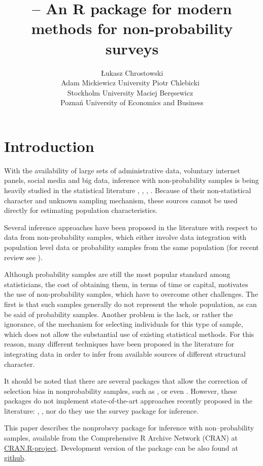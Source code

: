 \documentclass[
]{jss}
\author{
Łukasz Chrostowski\\Adam Mickiewicz University \And Piotr
Chlebicki~\orcidlink{0009-0006-4867-7434}\\Stockholm University
\AND Maciej Beręsewicz~\orcidlink{0000-0002-8281-4301}\\Poznań
University of Economics and Business
}
\title{\pkg{nonprobsvy} -- An R package for modern methods for
non-probability surveys}
\begin{document}
\hypertarget{introduction}{%
\section{Introduction}\label{introduction}}

With the availability of large sets of administrative data, voluntary
internet panels, social media and big data, inference with
non-probability samples is being heavily studied in the statistical
literature \citet{beaumont2020probability},
\citet{elliott_inference_2017}, \citet{berkesewicz2017two},
\citet{citro2014multiple}. Because of their non-statistical character
and unknown sampling mechanism, these sources cannot be used directly
for estimating population characteristics.

Several inference approaches have been proposed in the literature with
respect to data from non-probability samples, which either involve data
integration with population level data or probability samples from the
same population (for recent review see \citet{wu2022statistical}).

Although probability samples are still the most popular standard among
statisticians, the cost of obtaining them, in terms of time or capital,
motivates the use of non-probability samples, which have to overcome
other challenges. The first is that such samples generally do not
represent the whole population, as can be said of probability samples.
Another problem is the lack, or rather the ignorance, of the mechanism
for selecting individuals for this type of sample, which does not allow
the substantial use of existing statistical methods. For this reason,
many different techniques have been proposed in the literature for
integrating data in order to infer from available sources of different
structural character.

It should be noted that there are several packages that allow the
correction of selection bias in nonprobability samples, such as
\citet{GJRM}, \citet{NonProbEst} or even \citet{sampling}. However,
these packages do not implement state-of-the-art approaches recently
proposed in the literature: \citet{chen2020doubly},
\citet{yang_doubly_2020}, \citet{wu2022statistical} nor do they use the
survey package \citet{lumley2004} for inference.

This paper describes the nonprobsvy package for inference with
non--probability samples, available from the Comprehensive R Archive
Network (CRAN) at
\href{https://CRAN.R-project.org/package=nonprobsvy}{CRAN.R-project}.
Development version of the package can be also found at
\href{https://github.com/ncn-foreigners/nonprobsvy}{github}.
\end{document}
